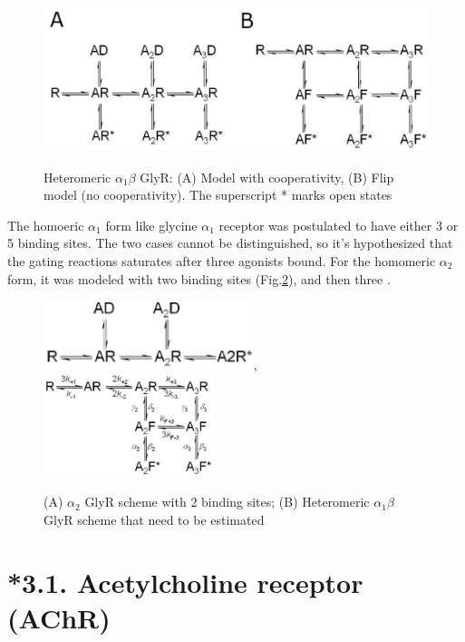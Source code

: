 \begin{figure}[hbt]
  \centerline{\includegraphics[height=5cm,
    angle=0]{./images/GlyR_model.eps}}
  \caption{Heteromeric $\alpha_1\beta$ GlyR: (A) Model with cooperativity, (B)
  Flip model (no cooperativity). The superscript * marks open states}
\label{fig:GlyR_model}
\end{figure}

The homoeric $\alpha_1$ form like glycine $\alpha_1$ receptor was postulated to
have either 3 or 5 binding sites. The two cases cannot be distinguished, so it's
hypothesized that the gating reactions saturates after three agonists bound.
For the homomeric $\alpha_2$ form, it was modeled with two binding sites
\citep{mangin2003} (Fig.\ref{fig:GlyR_alpha2_model}), and then three
\citep{wang2007}.

\begin{figure}[hbt]
  \centerline{\includegraphics[height=2cm,
    angle=0]{./images/GlyR_alpha2_scheme2bindingsite.eps},
\includegraphics[height=3cm,
    angle=0]{./images/GlyR_model_2.eps}}
  \caption{(A) $\alpha_2$ GlyR scheme with 2 binding sites; (B) Heteromeric
  $\alpha_1\beta$ GlyR scheme that need to be estimated}
\label{fig:GlyR_alpha2_model}
\end{figure}



\section{*3.1. Acetylcholine receptor (AChR)}
\label{sec:acetylcholine_receptor}
\label{sec:cholinergic-receptor}

